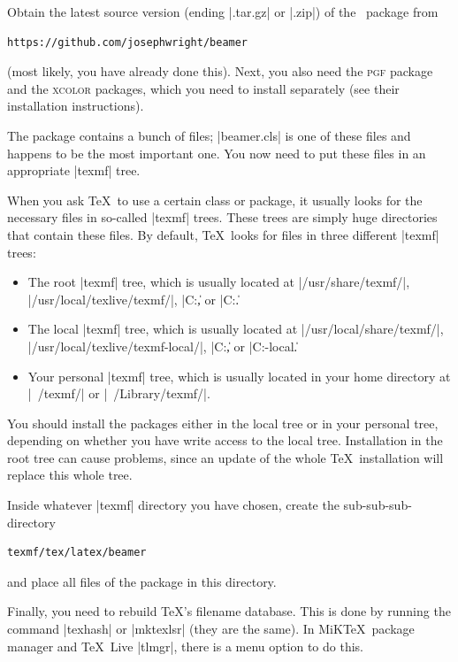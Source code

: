 Obtain the latest source version (ending |.tar.gz| or |.zip|) of the \beamer\ package from
\begin{verbatim}
https://github.com/josephwright/beamer
\end{verbatim}
(most likely, you have already done this). Next, you also need the \textsc{pgf} package and the \textsc{xcolor} packages, which you need to install separately (see their installation instructions).

The package contains a bunch of files; |beamer.cls| is one of these files and happens to be the most important one. You now need to put these files in an appropriate |texmf| tree.

When you ask \TeX\ to use a certain class or package, it usually looks for the necessary files in so-called |texmf| trees. These trees are simply huge directories that contain these files. By default, \TeX\ looks for files in three different |texmf| trees:
\begin{itemize}
\item
  The root |texmf| tree, which is usually located at |/usr/share/texmf/|, |/usr/local/texlive/texmf/|, |C:\texmf\|, or |C:\texlive\texmf\|.
\item
  The local  |texmf| tree, which is usually located at |/usr/local/share/texmf/|,\\ |/usr/local/texlive/texmf-local/|, |C:\localtexmf\|, or |C:\texlive\texmf-local\|.
\item
  Your personal |texmf| tree, which is usually located in your home directory at |~/texmf/| or |~/Library/texmf/|.
\end{itemize}

You should install the packages either in the local tree or in your personal tree, depending on whether you have write access to the local tree. Installation in the root tree can cause problems, since an update of the whole \TeX\ installation will replace this whole tree.

Inside whatever |texmf| directory you have chosen, create the sub-sub-sub-directory
\begin{verbatim}
texmf/tex/latex/beamer
\end{verbatim}
and place all files of the package in this directory.

Finally, you need to rebuild \TeX's filename database. This is done by running the command |texhash| or |mktexlsr| (they are the same). In MiK\TeX\ package manager and \TeX\ Live |tlmgr|, there is a menu option to do this.

